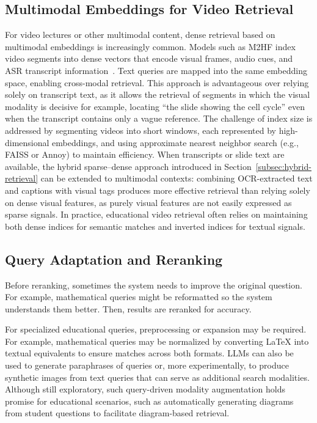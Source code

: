 \subsection{Multimodal Embeddings for Video Retrieval}
\label{subsec:multimodal-embeddings}

For video lectures or other multimodal content, dense retrieval based on multimodal embeddings is increasingly common. Models such as M2HF index video segments into dense vectors that encode visual frames, audio cues, and ASR transcript information~\cite{liu2022m2hf}. Text queries are mapped into the same embedding space, enabling cross-modal retrieval. This approach is advantageous over relying solely on transcript text, as it allows the retrieval of segments in which the visual modality is decisive for example, locating ``the slide showing the cell cycle'' even when the transcript contains only a vague reference. The challenge of index size is addressed by segmenting videos into short windows, each represented by high-dimensional embeddings, and using approximate nearest neighbor search (e.g., FAISS or Annoy) to maintain efficiency. When transcripts or slide text are available, the hybrid sparse--dense approach introduced in Section~\ref{subsec:hybrid-retrieval} can be extended to multimodal contexts: combining OCR-extracted text and captions with visual tags produces more effective retrieval than relying solely on dense visual features, as purely visual features are not easily expressed as sparse signals. In practice, educational video retrieval often relies on maintaining both dense indices for semantic matches and inverted indices for textual signals.

\subsection{Query Adaptation and Reranking}
\label{subsec:reranking-adaptation}

Before reranking, sometimes the system needs to improve the original question. For example, mathematical queries might be reformatted so the system understands them better. Then, results are reranked for accuracy.

For specialized educational queries, preprocessing or expansion may be required. For example, mathematical queries may be normalized by converting LaTeX into textual equivalents to ensure matches across both formats. LLMs can also be used to generate paraphrases of queries or, more experimentally, to produce synthetic images from text queries that can serve as additional search modalities. Although still exploratory, such query-driven modality augmentation holds promise for educational scenarios, such as automatically generating diagrams from student questions to facilitate diagram-based retrieval.

